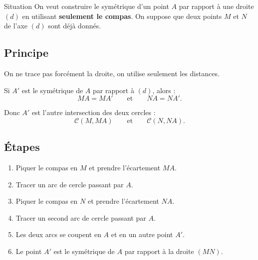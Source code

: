 \documentclass[11pt,a4paper]{article}
\begin{document}
\begin{boite}{Situation}
On veut construire le symétrique d'un point $A$ par rapport à une droite $(d)$ en utilisant \textbf{seulement le compas}.  
On suppose que deux points $M$ et $N$ de l'axe $(d)$ sont déjà donnés.
\end{boite}

\subsection*{Principe}

On ne trace pas forcément la droite, on utilise seulement les distances.

Si $A'$ est le symétrique de $A$ par rapport à $(d)$, alors :
\[
MA=MA'
\qquad \text{et} \qquad
NA=NA'.
\]

Donc $A'$ est l'autre intersection des deux cercles :
\[
\mathcal{C}(M,MA)
\qquad \text{et} \qquad
\mathcal{C}(N,NA).
\]

\subsection*{Étapes}

\begin{enumerate}[label=\textbf{Étape \arabic* :}]
    \item Piquer le compas en $M$ et prendre l'écartement $MA$.
    \item Tracer un arc de cercle passant par $A$.
    \item Piquer le compas en $N$ et prendre l'écartement $NA$.
    \item Tracer un second arc de cercle passant par $A$.
    \item Les deux arcs se coupent en $A$ et en un autre point $A'$.
    \item Le point $A'$ est le symétrique de $A$ par rapport à la droite $(MN)$.
\end{enumerate}

\begin{center}
\end{center}
\end{document}
